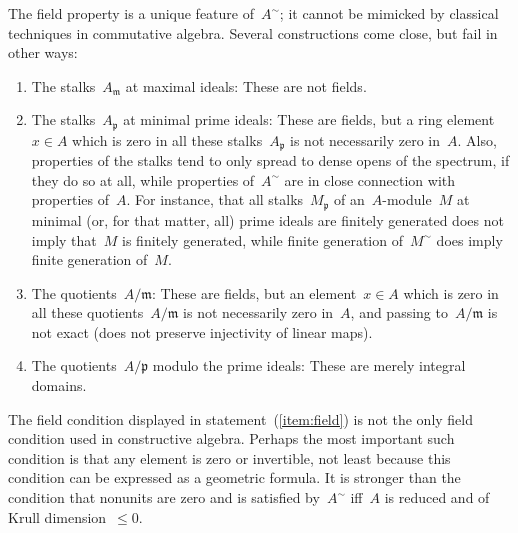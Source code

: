 \documentclass{ws-rv9x6}
\newcommand{\ppp}{\mathfrak{p}}
\newcommand{\mmm}{\mathfrak{m}}
\renewcommand{\_}{\mathpunct{.}}
\newcommand{\?}{\,{:}\,}
\begin{document}
The field property is a unique feature of~$A^\sim$; it cannot be mimicked by
classical techniques in commutative algebra. Several constructions come close,
but fail in other ways:
\begin{enumerate}
\item The stalks~$A_\mmm$ at maximal ideals: These are not fields.
\item The stalks~$A_\ppp$ at minimal prime ideals: These are fields, but a ring
element~$x \in A$ which is zero in all these stalks~$A_\ppp$ is not necessarily
zero in~$A$. Also, properties of the stalks tend to only spread to
dense opens of the spectrum, if they do so at all, while properties of~$A^\sim$
are in close connection with properties of~$A$. For instance, that all
stalks~$M_\ppp$ of an~$A$-module~$M$ at minimal (or, for that matter, all) prime ideals are finitely
generated does not imply that~$M$ is finitely generated, while finite
generation of~$M^\sim$ does imply finite generation of~$M$.
\item The quotients~$A/\mmm$: These are fields, but an element~$x \in A$ which is
zero in all these quotients~$A/\mmm$ is not necessarily zero in~$A$, and
passing to~$A/\mmm$ is not exact (does not preserve injectivity of linear
maps).
\item The quotients~$A/\ppp$ modulo the prime ideals: These are merely integral
domains.
\end{enumerate}

The field condition displayed in statement~(\ref{item:field}) is not the only
field condition used in constructive algebra. Perhaps the most important such
condition is that any element is zero or invertible, not least because this
condition can be expressed as a geometric formula. It is stronger than the
condition that nonunits are zero and is satisfied by~$A^\sim$ iff~$A$ is reduced
and of Krull dimension~$\leq 0$.
\end{document}
